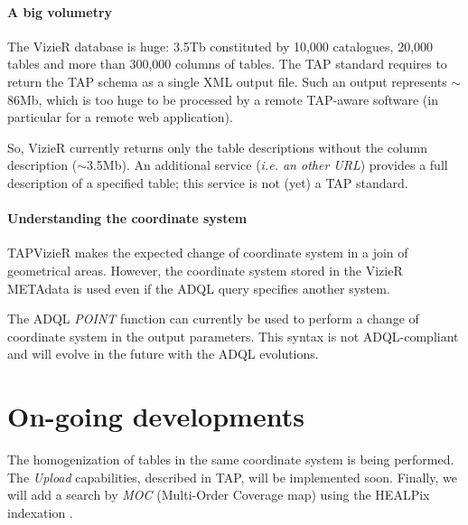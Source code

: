 \documentclass[11pt]{article}
\begin{document}
\paragraph{A big volumetry}

The VizieR database is huge:  3.5Tb constituted by 10,000 catalogues, 20,000
tables and more than 300,000 columns of tables. The TAP standard requires
to return the TAP schema as a single XML output file. Such an output represents
$\sim$86Mb, which is too huge to be processed by a remote TAP-aware
software (in 
particular for a remote web application).

So, VizieR currently returns only the table descriptions without the 
column description ($\sim$3.5Mb). 
An additional service (\textit{i.e. an other URL}) provides a full
description of a specified table; this service is not (yet) a TAP standard.

\paragraph{Understanding the coordinate system}

%

TAPVizieR makes the expected change of coordinate system in a join of 
geometrical  areas. However, the coordinate system stored in the VizieR 
METAdata is used even if the ADQL query specifies another system.

The ADQL {\em POINT} function can currently be used %
to perform a change of coordinate system in the output parameters.
This syntax is not ADQL-compliant and  will evolve in the future with
the ADQL evolutions.

\section{On-going developments}

The homogenization of tables in the same coordinate system is being performed. %
The {\em Upload} capabilities, described in TAP, will be implemented soon.
Finally, we will add a search by {\em MOC}  (Multi-Order Coverage map) 
using the HEALPix indexation \citep{O13_adassxxii}.


\end{document}
